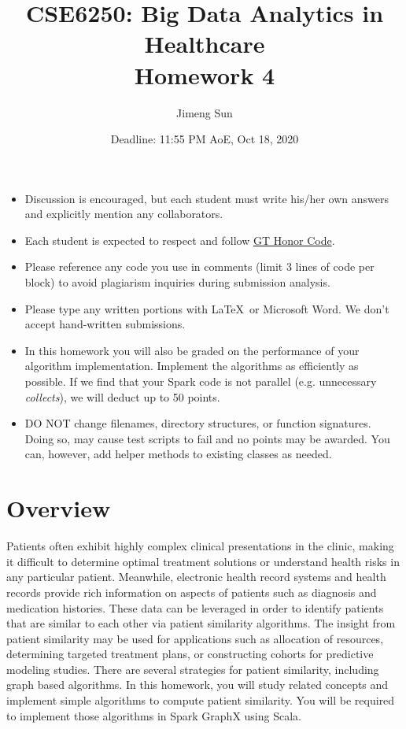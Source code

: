 \documentclass[12pt]{article}
\title{CSE6250: Big Data Analytics in Healthcare \\ Homework 4}
\author{Jimeng Sun}
\date{Deadline: 11:55 PM AoE, Oct 18, 2020}
\begin{document}
\maketitle
\begin{itemize}
\item Discussion is encouraged, but each student must write his/her own answers and explicitly mention any collaborators.
\item Each student is expected to respect and follow \href{http://osi.gatech.edu/content/honor-code}{GT Honor Code}.
\item Please reference any code you use in comments (limit 3 lines of code per block) to avoid plagiarism inquiries during submission analysis.
\item Please type any written portions with \LaTeX\ or Microsoft Word. We don't accept hand-written submissions.
\item In this homework you will also be graded on the performance of your algorithm implementation. Implement the algorithms as efficiently as possible. If we find that your Spark code is not parallel (e.g. unnecessary \textit{collects}), we will deduct up to 50 points.
\item DO NOT change filenames, directory structures, or function signatures. Doing so, may cause test scripts to fail and no points may be awarded. You can, however, add helper methods to existing classes as needed.
\end{itemize}

\section*{Overview}

Patients often exhibit highly complex clinical presentations in the clinic, making it difficult to determine optimal treatment solutions or understand health risks in any particular patient. Meanwhile, electronic health record systems and health records provide rich information on aspects of patients such as diagnosis and medication histories. These data can be leveraged in order to identify patients that are similar to each other via patient similarity algorithms. The insight from patient similarity may be used for applications such as allocation of resources, determining targeted treatment plans, or constructing cohorts for predictive modeling studies. There are several strategies for patient similarity, including graph based algorithms.
In this homework, you will study related concepts and implement simple algorithms to compute patient similarity. You will be required to implement those algorithms in Spark GraphX using Scala.
\end{document}
